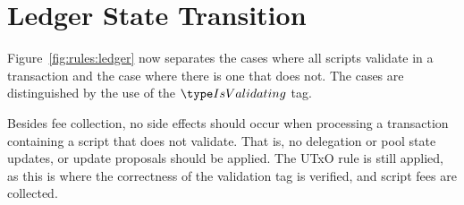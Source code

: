 \section{Ledger State Transition}
\label{sec:ledger-trans}

Figure~\ref{fig:rules:ledger} now separates the cases where all scripts
validate in a transaction and the case where there is one that does not.
The cases are distinguished by the use of the $\IsValidating$ tag.

Besides fee collection, no side effects should occur when processing a
transaction containing a script that does not validate. That is, no
delegation or pool state updates, or update proposals should be
applied. The UTxO rule is still applied, as this is where the correctness of the
validation tag is verified, and script fees are collected.

